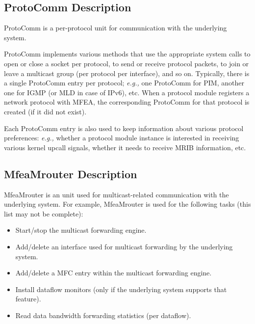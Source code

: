 \documentclass[11pt]{article}
\newcommand{\eg}{\emph{e.g.,}\xspace}
\begin{document}
\subsection{ProtoComm Description}

ProtoComm is a per-protocol unit for communication with the
underlying system.

ProtoComm implements various methods that use the appropriate system
calls to open or close a socket per protocol, to send or receive
protocol packets, to join or leave a multicast group (per protocol per
interface), and so on. Typically, there is a single ProtoComm entry per
protocol; \eg one ProtoComm for PIM, another one for IGMP (or MLD in
case of IPv6), etc. When a protocol module registers a network protocol
with MFEA, the corresponding ProtoComm for that protocol is created (if
it did not exist).

Each ProtoComm entry is also used to keep information about various
protocol preferences: \eg whether a protocol module instance is interested in
receiving various kernel upcall signals, whether it needs to receive
MRIB information, etc.

\subsection{MfeaMrouter Description}

MfeaMrouter is an unit used for multicast-related communication with the
underlying system. For example, MfeaMrouter is used for the following
tasks (this list may not be complete):

\begin{itemize}

  \item Start/stop the multicast forwarding engine.

  \item Add/delete an interface used for multicast forwarding by the
  underlying system.

  \item Add/delete a MFC entry within the multicast forwarding engine.

  \item Install dataflow monitors (only if the underlying system supports
  that feature).

  \item Read data bandwidth forwarding statistics (per dataflow).

\end{itemize}
\end{document}
